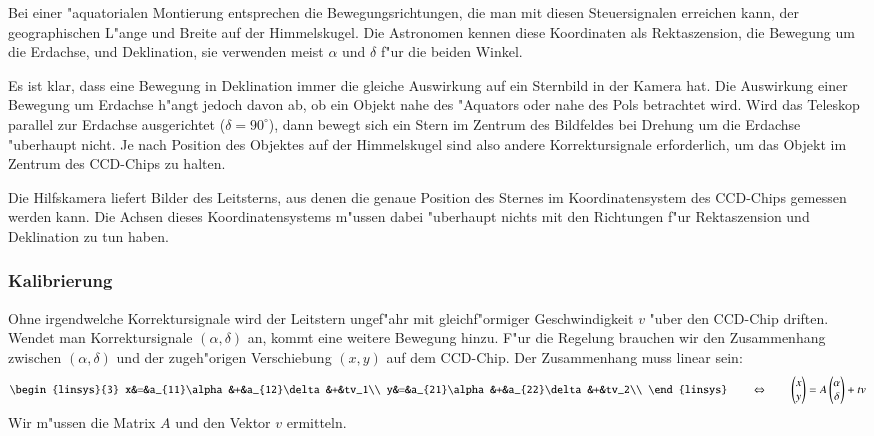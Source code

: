 Bei einer "aquatorialen Montierung entsprechen die Bewegungsrichtungen,
die man mit diesen Steuersignalen erreichen kann, der geographischen
L"ange und Breite auf der Himmelskugel. Die Astronomen kennen diese
Koordinaten als Rektaszension, die Bewegung um die Erdachse, und Deklination,
sie verwenden meist $\alpha$ und $\delta$ f"ur die beiden Winkel.

Es ist klar, dass eine Bewegung in Deklination immer die gleiche Auswirkung
auf ein Sternbild in der Kamera hat.
Die Auswirkung einer Bewegung um Erdachse h"angt jedoch
davon ab, ob ein Objekt nahe des "Aquators oder nahe des Pols
betrachtet wird. Wird das Teleskop parallel zur Erdachse ausgerichtet
($\delta=90^\circ$), dann bewegt sich ein Stern im Zentrum des Bildfeldes
bei Drehung um die Erdachse "uberhaupt nicht.
Je nach Position des Objektes auf der Himmelskugel sind also andere
Korrektursignale erforderlich, um das Objekt im Zentrum des CCD-Chips
zu halten.

Die Hilfskamera liefert Bilder des Leitsterns, aus denen die genaue
Position des Sternes im Koordinatensystem des CCD-Chips gemessen
werden kann. Die Achsen dieses Koordinatensystems m"ussen dabei
"uberhaupt nichts mit den Richtungen f"ur Rektaszension und Deklination
zu tun haben.

\subsubsection{Kalibrierung}
Ohne irgendwelche Korrektursignale wird der Leitstern ungef"ahr mit
gleichf"ormiger Geschwindigkeit $v$ "uber den CCD-Chip driften.
Wendet man Korrektursignale $(\alpha,\delta)$ an, kommt eine
weitere Bewegung hinzu. F"ur die Regelung brauchen wir den Zusammenhang
zwischen $(\alpha,\delta)$ und der zugeh"origen Verschiebung $(x,y)$ auf dem
CCD-Chip. Der Zusammenhang muss linear sein:
\begin{equation}
\begin{linsys}{3}
x&=&a_{11}\alpha&+&a_{12}\delta&+&tv_1\\
y&=&a_{21}\alpha&+&a_{22}\delta&+&tv_2\\
\end{linsys}
\qquad
\Leftrightarrow
\qquad
\begin{pmatrix}x\\y\end{pmatrix}
=A\begin{pmatrix}\alpha\\\delta\end{pmatrix}+tv
\label{guiding:model}
\end{equation}
Wir m"ussen die Matrix $A$ und den Vektor $v$ ermitteln.

